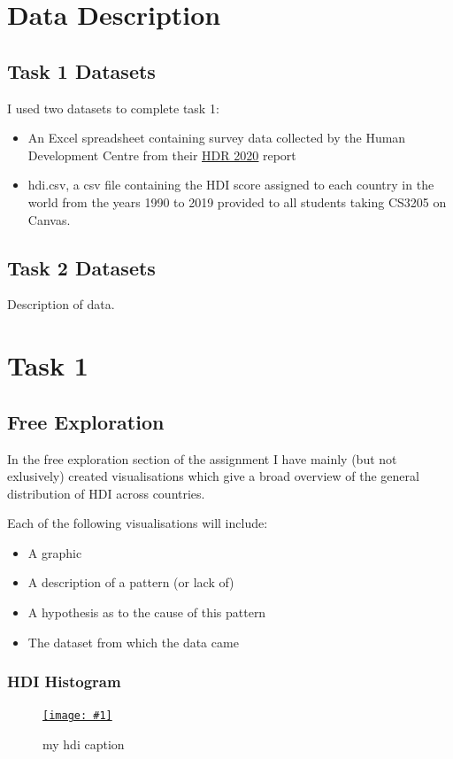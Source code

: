 \documentclass[11pt,a4paper,final]{article}
\newcommand\onlinefig[3]{
\begin{figure}[H]
  \centering
  \href{#3}{\texttt{[image: \#1]}}
  \caption{#2} 
  \label{fig:#1}
\end{figure}
}
\begin{document}
\pagebreak
\begin{multicols}{2}
\section{Data Description}
\subsection{Task 1 Datasets}
I used two datasets to complete task 1:
\begin{itemize}
	\item An Excel spreadsheet containing survey data collected by the Human Development Centre from their \hyperref[sec:References]{\underline{HDR 2020}} report
	\item hdi.csv, a csv file containing the HDI score assigned to each country in the world from the years 1990 to 2019 provided to all students taking CS3205 on Canvas.
\end{itemize}

\subsection{Task 2 Datasets}
Description of data.


\section{Task 1}
\subsection{Free Exploration}
In the free exploration section of the assignment I have mainly (but not exlusively) created visualisations which give a broad overview of the general distribution of HDI across countries.

Each of the following visualisations will include:
\begin{itemize}
	\item A graphic
	\item A description of a pattern (or lack of)
	\item A hypothesis as to the cause of this pattern
	\item The dataset from which the data came
\end{itemize}

\subsubsection{HDI Histogram}
\onlinefig{hdi_histogram}{my hdi caption}{https://public.tableau.com/views/CS3205-HDI/Sheet6?:language=en-GB&:display_count=n&:origin=viz_share_link}


\end{multicols}
\end{document}
